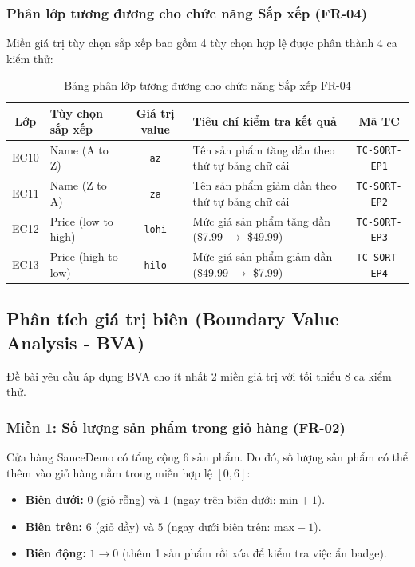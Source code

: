 \documentclass[a4paper]{article}
\begin{document}
\subsubsection{Phân lớp tương đương cho chức năng Sắp xếp (FR-04)}
Miền giá trị tùy chọn sắp xếp bao gồm 4 tùy chọn hợp lệ được phân thành 4 ca kiểm thử:
\begin{table}[H]
\centering
\small
\begin{tabularx}{\textwidth}{|c|l|c|X|c|}
\hline
\textbf{Lớp} & \textbf{Tùy chọn sắp xếp} & \textbf{Giá trị value} & \textbf{Tiêu chí kiểm tra kết quả} & \textbf{Mã TC} \\ \hline
EC10 & Name (A to Z) & \texttt{az} & Tên sản phẩm tăng dần theo thứ tự bảng chữ cái & \texttt{TC-SORT-EP1} \\ \hline
EC11 & Name (Z to A) & \texttt{za} & Tên sản phẩm giảm dần theo thứ tự bảng chữ cái & \texttt{TC-SORT-EP2} \\ \hline
EC12 & Price (low to high) & \texttt{lohi} & Mức giá sản phẩm tăng dần (\$7.99 $\rightarrow$ \$49.99) & \texttt{TC-SORT-EP3} \\ \hline
EC13 & Price (high to low) & \texttt{hilo} & Mức giá sản phẩm giảm dần (\$49.99 $\rightarrow$ \$7.99) & \texttt{TC-SORT-EP4} \\ \hline
\end{tabularx}
\caption{Bảng phân lớp tương đương cho chức năng Sắp xếp FR-04}
\end{table}

\clearpage
\subsection{Phân tích giá trị biên (Boundary Value Analysis - BVA)}
Đề bài yêu cầu áp dụng BVA cho ít nhất 2 miền giá trị với tối thiểu 8 ca kiểm thử.

\subsubsection{Miền 1: Số lượng sản phẩm trong giỏ hàng (FR-02)}
Cửa hàng SauceDemo có tổng cộng 6 sản phẩm. Do đó, số lượng sản phẩm có thể thêm vào giỏ hàng nằm trong miền hợp lệ $[0, 6]$:
\begin{itemize}
  \item \textbf{Biên dưới:} $0$ (giỏ rỗng) và $1$ (ngay trên biên dưới: $\text{min}+1$).
  \item \textbf{Biên trên:} $6$ (giỏ đầy) và $5$ (ngay dưới biên trên: $\text{max}-1$).
  \item \textbf{Biên động:} $1 \rightarrow 0$ (thêm 1 sản phẩm rồi xóa để kiểm tra việc ẩn badge).
\end{itemize}
\end{document}
